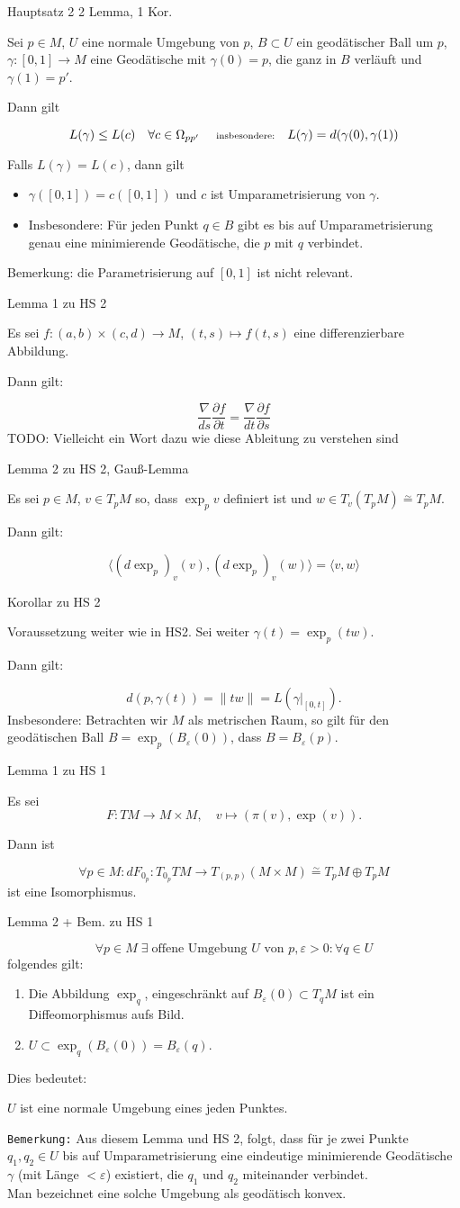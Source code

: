 \documentclass[a6paper,11pt,grid=front]{kartei}
\newcommand{\fl}[1]{\begin{flushleft}
 #1 \end{flushleft}}
\newcommand{\eps}{\varepsilon}
\newcounter{def}
\newcounter{satz}
\begin{document}
\nonameyet
{Hauptsatz 2} {\scriptsize 2 Lemma, 1 Kor.}
{
\small
Sei $p\in M$, $U$ eine normale Umgebung von $p$, $B \subset U$ ein 
geodätischer Ball um $p$, $\gamma:[0,1] \to M$ eine Geodätische mit 
$\gamma(0) = p$, die ganz in $B$ verläuft und $\gamma(1) = p'$.
%
\fl{Dann gilt}  
\[
L(\gamma) \leq L(c) \quad \forall c \in \Omega_{pp'}
\quad \text { \scriptsize insbesondere:} \quad 
L(\gamma) = d(\gamma(0),\gamma(1))
\]
\fl{Falls $L(\gamma) = L(c)$, dann gilt }
\begin{itemize}[-]
\item $\gamma([0,1]) = c([0,1])$ und $c$ ist Umparametrisierung von $\gamma$.
\item Insbesondere: Für jeden Punkt $q \in B$ gibt es bis auf Umparametrisierung
genau eine minimierende Geodätische, die $p$ mit $q$ verbindet.
\end{itemize}
Bemerkung: die Parametrisierung auf $[0,1]$ ist nicht relevant.
}
{}

\nonameyet
{Lemma 1} {zu HS 2}
{
Es sei $f: (a,b) \times (c,d) \to M$, $(t,s) \mapsto f(t,s)$ eine 
differenzierbare Abbildung.
\fl{Dann gilt:}
\[
\frac{\nabla}{ds} \frac{\partial f}{\partial t} 
= \frac{\nabla}{dt} \frac{\partial f}{\partial s}
\]	
TODO: Vielleicht ein Wort dazu wie diese Ableitung zu verstehen sind
}
{}

\nonameyet
{Lemma 2} {\small zu HS 2, Gauß-Lemma}
{
Es sei $p\in M$, $v\in T_pM$ so, dass $\exp_p v$ definiert ist
und $w\in T_v (T_p M) \overset{\sim}{=} T_pM$. 

\fl{Dann gilt:}
\[
\langle (d \exp_p)_v (v), (d \exp_p)_v(w) \rangle
= \langle v, w \rangle 
\]
}
{}

\nonameyet
{Korollar} {zu HS 2}
{
Voraussetzung weiter wie in HS2. Sei weiter 
$\gamma(t) = \exp_p(tw)$.
\fl{Dann gilt:}
\[
d(p,\gamma(t)) = \| tw \| = L(\gamma|_{[0,t]}).
\]
Insbesondere: Betrachten wir $M$ als metrischen Raum, so gilt für den
geodätischen Ball $B = \exp_p(B_\eps (0))$, dass $B = B_\eps(p)$.
}
{}


\nonameyet
{Lemma 1} {zu HS 1}
{
Es sei 
\[
F: TM \to M \times M, \quad v \mapsto (\pi(v), \exp(v)).
\]
\fl{Dann ist}
\[
\forall p\in M : dF_{0_p}: T_{0_p}TM \to T_{(p,p)}(M \times M)
\overset{\sim}{=} T_pM \oplus T_pM
\]
ist eine Isomorphismus.
}
{}


\nonameyet
{Lemma 2 + Bem.} {zu HS 1}
{
\small
\[
\forall p \in M \; \exists \; \text{offene Umgebung $U$ von } p, \eps > 0: 
\forall q\in U
\]
folgendes gilt:
\begin{enumerate}[1.]
\item  Die Abbildung $\exp_q$, eingeschränkt auf $B_\eps(0) \subset T_qM$ 
ist ein Diffeomorphismus aufs Bild.
\item $U\subset \exp_q(B_\eps(0)) = B_\eps(q)$.
\end{enumerate}
%
\fl{Dies bedeutet:}
$U$ ist eine normale Umgebung eines jeden Punktes.
\fl{\texttt{Bemerkung:}
Aus diesem Lemma und HS 2, folgt, dass für je zwei Punkte $q_1, q_2 \in U$ 
bis auf Umparametrisierung eine eindeutige minimierende Geodätische 
$\gamma$ (mit Länge $< \eps$) existiert, die $q_1$ und $q_2$
miteinander verbindet.
\\
Man bezeichnet eine solche Umgebung als geodätisch konvex.}
}
{}
\end{document}
